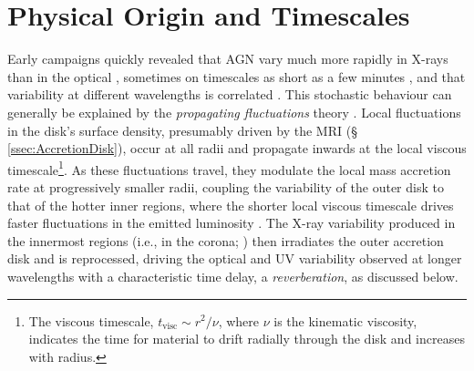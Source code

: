 
\section{Physical Origin and Timescales}
\label{sec:PhysOrigin}

Early campaigns quickly revealed that AGN vary much more rapidly in X-rays than in the optical \parencite{WinklerWhite1975XRayVariab}, sometimes on timescales as short as a few minutes \parencite{McHardy1981minuteVar}, and that variability at different wavelengths is correlated \parencite{Ulrich1997VARIABILITY}. This stochastic behaviour can generally be explained by the \textit{propagating fluctuations} theory \parencite{Lyubarskii1997PropFluct}. Local fluctuations in the disk's surface density, presumably driven by the MRI (\S\,\ref{ssec:AccretionDisk}), occur at all radii and propagate inwards at the local viscous timescale\footnote{The viscous timescale, $t_\mathrm{visc} \sim r^2/\nu$, where $\nu$ is the kinematic viscosity, indicates the time for material to drift radially through the disk and increases with radius.}. As these fluctuations travel, they modulate the local mass accretion rate at progressively smaller radii, coupling the variability of the outer disk to that of the hotter inner regions, where the shorter local viscous timescale drives faster fluctuations in the emitted luminosity \parencite{Uttley2023AccretionLags}. The X-ray variability produced in the innermost regions (i.e., in the corona; \cite{Krolik1991OGCoronaDrivenVaria}) then irradiates the outer accretion disk and is reprocessed, driving the optical and UV variability observed at longer wavelengths with a characteristic time delay, a \textit{reverberation}, as discussed below.

